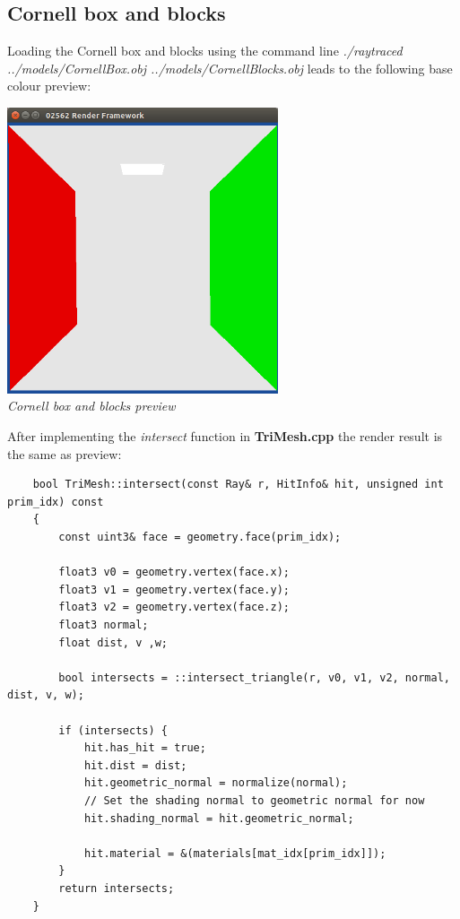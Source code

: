 \documentclass[a4,12pt]{article}
\begin{document}
	\subsection{Cornell box and blocks}
	Loading the Cornell box and blocks using the command line \textit{./raytraced ../models/CornellBox.obj ../models/CornellBlocks.obj} leads to the following base colour preview:
	\begin{center}
		\includegraphics[width=8cm]{./Worksheet4/CornellBasePreview}\\
		\textit{Cornell box and blocks preview}
	\end{center}
	
	After implementing the \textit{intersect} function in \textbf{TriMesh.cpp} the render result is the same as preview:
	\begin{lstlisting}
	bool TriMesh::intersect(const Ray& r, HitInfo& hit, unsigned int prim_idx) const
	{
		const uint3& face = geometry.face(prim_idx);
		
		float3 v0 = geometry.vertex(face.x);
		float3 v1 = geometry.vertex(face.y);
		float3 v2 = geometry.vertex(face.z);
		float3 normal;
		float dist, v ,w;

		bool intersects = ::intersect_triangle(r, v0, v1, v2, normal, dist, v, w);
		
		if (intersects) {
			hit.has_hit = true;
			hit.dist = dist;
			hit.geometric_normal = normalize(normal);
			// Set the shading normal to geometric normal for now
			hit.shading_normal = hit.geometric_normal;
			
			hit.material = &(materials[mat_idx[prim_idx]]);
		}
		return intersects;
	}
	\end{lstlisting}
	
\end{document}
